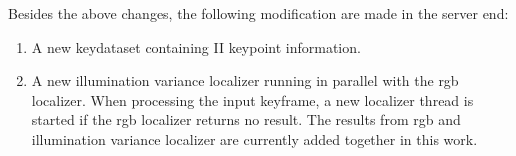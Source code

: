 Besides the above changes, the following modification are made in the server end:

\begin{enumerate}
	\item A new keydataset containing II keypoint information. 
	\item A new illumination variance localizer running in parallel with the rgb localizer. When processing the input keyframe, a new localizer thread is started if the rgb localizer returns no result. The results from rgb and illumination variance localizer are currently added together in this work.
\end{enumerate}





\newpage
